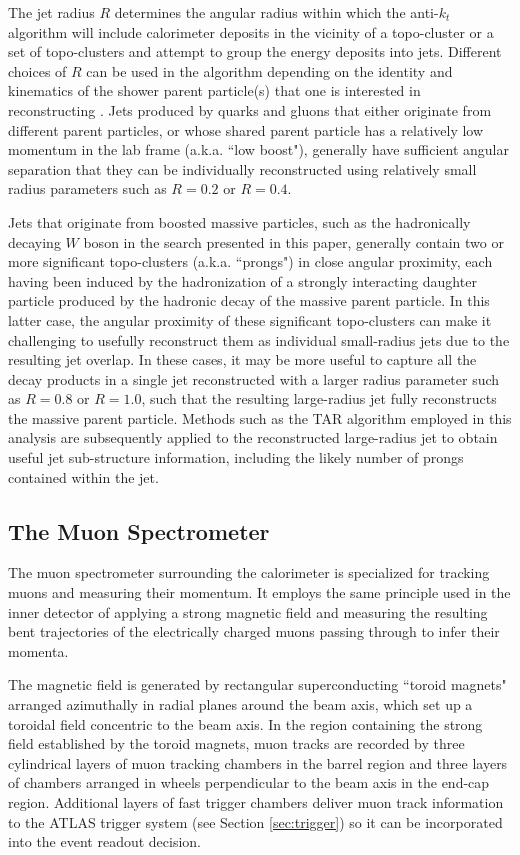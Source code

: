 The jet radius \(R\) determines the angular radius within which the anti-\(k_t\) algorithm will include calorimeter deposits in the vicinity of a topo-cluster or a set of topo-clusters and attempt to group the energy deposits into jets. Different choices of \(R\) can be used in the algorithm depending on the identity and kinematics of the shower parent particle(s) that one is interested in reconstructing \cite{jet_reco}. Jets produced by quarks and gluons that either originate from different parent particles, or whose shared parent particle has a relatively low momentum in the lab frame (a.k.a. ``low boost"), generally have sufficient angular separation that they can be individually reconstructed using relatively small radius parameters such as \(R=0.2\) or \(R=0.4\). 

Jets that originate from boosted massive particles, such as the hadronically decaying \(W\) boson in the search presented in this paper, generally contain two or more significant topo-clusters (a.k.a. ``prongs") in close angular proximity, each having been induced by the hadronization of a strongly interacting daughter particle produced by the hadronic decay of the massive parent particle. In this latter case, the angular proximity of these significant topo-clusters can make it challenging to usefully reconstruct them as individual small-radius jets due to the resulting jet overlap. In these cases, it may be more useful to capture all the decay products in a single jet reconstructed with a larger radius parameter such as \(R=0.8\) or \(R=1.0\), such that the resulting large-radius jet fully reconstructs the massive parent particle. Methods such as the TAR algorithm \cite{TAR_algo} employed in this analysis are subsequently applied to the reconstructed large-radius jet to obtain useful jet sub-structure information, including the likely number of prongs contained within the jet.

\subsection{The Muon Spectrometer}
\label{sec:muon_spec}

The muon spectrometer \cite{atlas} surrounding the calorimeter is specialized for tracking muons and measuring their momentum. It employs the same principle used in the inner detector of applying a strong magnetic field and measuring the resulting bent trajectories of the electrically charged muons passing through to infer their momenta. 

The magnetic field is generated by rectangular superconducting ``toroid magnets" arranged azimuthally in radial planes around the beam axis, which set up a toroidal field concentric to the beam axis. In the region containing the strong field established by the toroid magnets, muon tracks are recorded by three cylindrical layers of muon tracking chambers in the barrel region and three layers of chambers arranged in wheels perpendicular to the beam axis in the end-cap region. Additional layers of fast trigger chambers deliver muon track information to the ATLAS trigger system (see Section \ref{sec:trigger}) so it can be incorporated into the event readout decision. 

